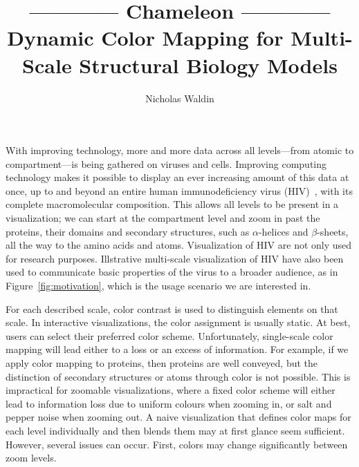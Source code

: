 \documentclass[review,journal]{vgtc}         %
\title{------------ Chameleon ------------ \\ Dynamic Color Mapping	for Multi-Scale Structural Biology Models}
\author{Nicholas Waldin}
\begin{document}
	
	
	\label{introduction}
	\maketitle
	
	With improving technology, more and more data across all levels---from atomic to compartment---is being gathered on viruses and cells. 
	Improving computing technology makes it possible to display an ever increasing amount of this data at once, up to and beyond an entire human immunodeficiency virus (HIV)~\cite{muzic2015cellview}, with its complete macromolecular composition.
	This allows all levels to be present in a visualization; we can start at the compartment level and zoom in past the proteins, their domains and secondary structures, such as $\alpha$-helices and $\beta$-sheets, all the way to the amino acids and atoms. Visualization of HIV are not only used for research purposes. Illstrative multi-scale visualization of HIV have also been used to communicate basic properties of the virus to a broader audience, as in Figure~\ref{fig:motivation}, which is the usage scenario we are interested in.
	
	For each described scale, color contrast is used to distinguish elements on that scale. 
	In interactive visualizations, the color assignment is usually static. 
	At best, users can select their preferred color scheme. 
	Unfortunately, single-scale color mapping will lead either to a loss or an excess of information.
	For example, if we apply color mapping to proteins, then proteins are well conveyed, but the distinction of secondary structures or atoms through color is not possible.
	This is impractical for zoomable visualizations, where a fixed color scheme will either lead to information loss due to uniform colours when zooming in, or salt and pepper noise when zooming out.	
	A naive visualization that defines color maps for each level individually and then blends them may at first glance seem sufficient.
	However, several issues can occur.
	First, colors may change significantly between zoom levels.
\end{document}
